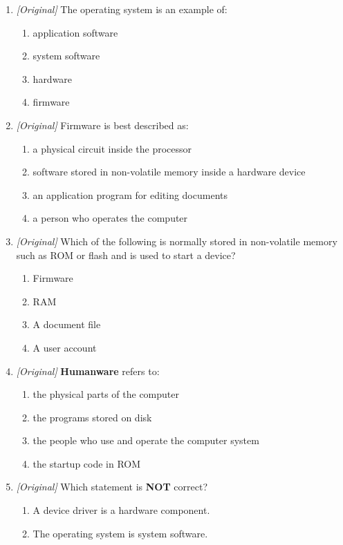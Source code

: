 \begin{enumerate}[label=\textbf{Q\arabic*.}, leftmargin=*]
\item \textit{[Original]} The operating system is an example of:
  \begin{enumerate}[label=\Alph*.]
    \item application software
    \item system software
    \item hardware
    \item firmware
  \end{enumerate}
\item \textit{[Original]} Firmware is best described as:
  \begin{enumerate}[label=\Alph*.]
    \item a physical circuit inside the processor
    \item software stored in non-volatile memory inside a hardware device
    \item an application program for editing documents
    \item a person who operates the computer
  \end{enumerate}
\item \textit{[Original]} Which of the following is normally stored in
  non-volatile memory such as ROM or flash and is used to start a device?
  \begin{enumerate}[label=\Alph*.]
    \item Firmware
    \item RAM
    \item A document file
    \item A user account
  \end{enumerate}
\item \textit{[Original]} \textbf{Humanware} refers to:
  \begin{enumerate}[label=\Alph*.]
    \item the physical parts of the computer
    \item the programs stored on disk
    \item the people who use and operate the computer system
    \item the startup code in ROM
  \end{enumerate}
\item \textit{[Original]} Which statement is \textbf{NOT} correct?
  \begin{enumerate}[label=\Alph*.]
    \item A device driver is a hardware component.
    \item The operating system is system software.

\end{enumerate}
\end{enumerate}
